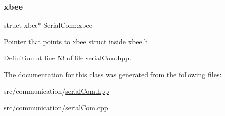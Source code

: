\mbox{\label{class_serial_com_ad5b8e665ab2218ad6caedd59738a7c12}} 
\subsubsection{\texorpdfstring{xbee}{xbee}}
{\footnotesize\ttfamily struct xbee$\ast$ Serial\+Com\+::xbee\hspace{0.3cm}{\ttfamily [private]}}

Pointer that points to xbee struct inside xbee.\+h. 

Definition at line 53 of file serial\+Com.\+hpp.



The documentation for this class was generated from the following files\+:\begin{DoxyCompactItemize}
\item 
src/communication/\hyperlink{serial_com_8hpp}{serial\+Com.\+hpp}\item 
src/communication/\hyperlink{serial_com_8cpp}{serial\+Com.\+cpp}\end{DoxyCompactItemize}
